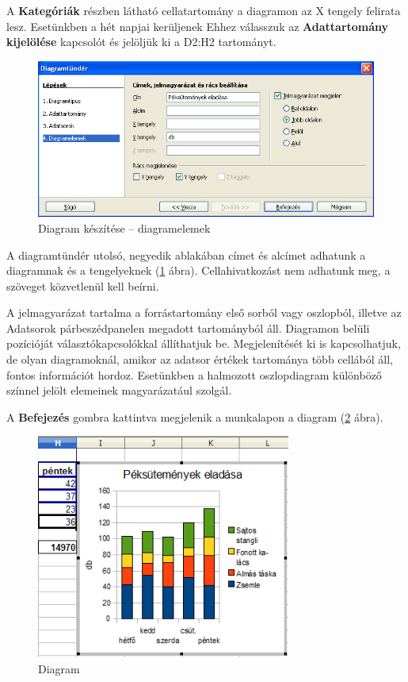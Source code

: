 A \textbf{Kategóriák} részben látható cellatartomány a
diagramon az X tengely felirata lesz. Esetünkben a hét napjai
kerüljenek Ehhez válasszuk az \textbf{Adattartomány
kijelölése} kapcsolót és jelöljük ki a D2:H2 tartományt.

\begin{figure}[!h]
\begin{center}
\includegraphics[width=15.499cm]{oocalcv2-img56.png}
\caption{Diagram készítése --  diagramelemek}\label{DiagramElemek}
\end{center}
\end{figure}

A diagramtündér utolsó, negyedik ablakában címet és
alcímet adhatunk a diagramnak és a tengelyeknek (\ref{DiagramElemek} ábra).
Cellahivatkozást nem adhatunk meg, a szöveget közvetlenül kell
beírni.

A jelmagyarázat tartalma a forrástartomány első sorból vagy
oszlopból, illetve az Adatsorok párbeszédpanelen megadott
tartományból áll. Diagramon belüli pozícióját
választókapcsolókkal állíthatjuk be. Megjelenítését ki
is kapcsolhatjuk, de olyan diagramoknál, amikor az adatsor
értékek tartománya több cellából áll, fontos
információt hordoz. Esetünkben a halmozott oszlopdiagram
különböző színnel jelölt elemeinek magyarázatául
szolgál.

A \textbf{Befejezés} gombra kattintva megjelenik a munkalapon a
diagram (\ref{Diagram} ábra). 

\begin{figure}[!h]
\begin{center}
\includegraphics[width=8.364cm]{oocalcv2-img57.png}
\caption{Diagram}\label{Diagram}
\end{center}
\end{figure}


